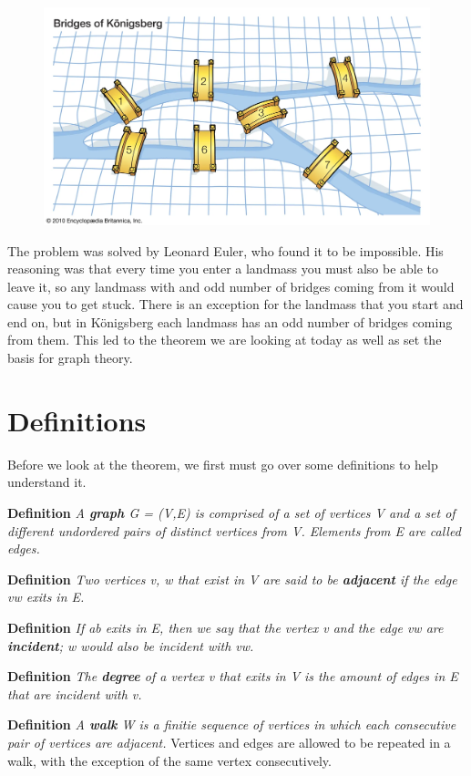 \documentclass[10pt]{amsart}
\begin{document}
\begin{figure}[h!]
\centerline{
{\includegraphics[width=.7\textwidth]{pictures/bridge_pic.png}}}\label{bridge}
\end{figure} 

The problem was solved by Leonard Euler, who found it to be impossible. His reasoning was that 
every time you enter a landmass you must also be able to leave it, so any landmass with and odd
number of bridges coming from it would cause you to get stuck. There is an exception for the landmass
that you start and end on, but in K\"{o}nigsberg each landmass has an odd number of bridges coming from
them. This led to the theorem we are looking at today as well as set the basis for graph theory.

\section{Definitions}
\noindent
Before we look at the theorem, we first must go over some definitions to help understand it.

\noindent
\textbf{Definition} 
\emph{
    A \textbf{graph} G = (V,E) is comprised of a set of vertices V and a set of 
    different undordered pairs of distinct vertices from V. Elements from E are called edges.
}

\noindent
\textbf{Definition} 
\emph{
    Two vertices v, w that exist in V are said to be \textbf{adjacent} if the
    edge vw exits in E.
}

\noindent
\textbf{Definition}
\emph{
    If ab exits in E, then we say that the vertex v and the edge vw are \textbf{incident}; w would
    also be incident with vw.
}

\noindent
\textbf{Definition}
\emph{
    The \textbf{degree} of a vertex v that exits in V is the amount of edges in E that are incident
    with v.
}

\noindent
\textbf{Definition}
\emph{
    A \textbf{walk} W is a finitie sequence of vertices in which each consecutive pair of vertices
    are adjacent.
}
Vertices and edges are allowed to be repeated in a walk, with the exception of the same vertex consecutively.
\end{document}
